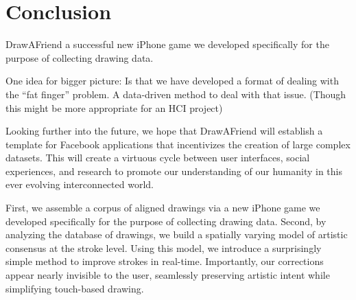 \section{Conclusion}

DrawAFriend
a successful new iPhone game we developed specifically for the
purpose of collecting drawing data.

One idea for bigger picture: Is that we have developed a format of dealing with the ``fat finger'' problem. A data-driven method to deal with that issue. (Though this might be more appropriate for an HCI project)

Looking further into the future, we hope that DrawAFriend will establish a template for Facebook applications that incentivizes the creation of large complex datasets. This will create a virtuous cycle between user interfaces, social experiences, and research to promote our understanding of our humanity in this ever evolving interconnected world.

First, we assemble a corpus of aligned
drawings via a new iPhone game we developed specifically for the
purpose of collecting drawing data. Second, by analyzing the
database of drawings, we build a spatially varying model of artistic
consensus at the stroke level. Using this model, we introduce a
surprisingly simple method to improve strokes in real-time.
Importantly, our corrections appear nearly invisible to the user,
seamlessly preserving artistic intent while simplifying touch-based
drawing.